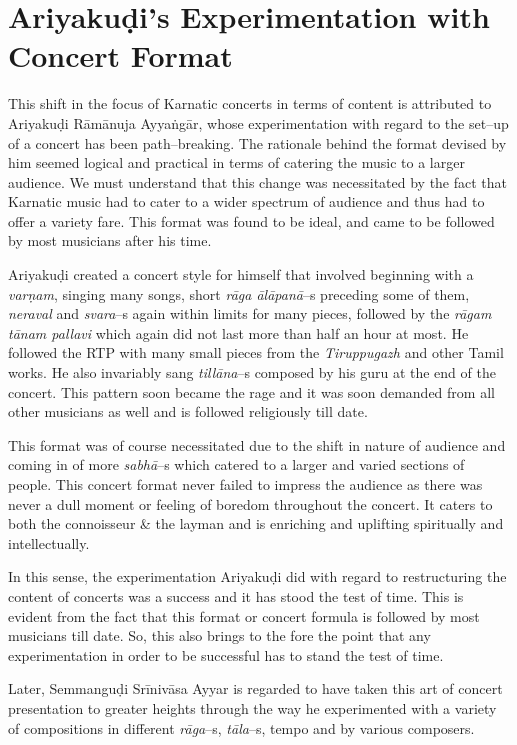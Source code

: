 \section*{Ariyakuḍi’s Experimentation with Concert Format}

This shift in the focus of Karnatic concerts in terms of content is attributed to Ariyakuḍi Rāmānuja Ayyaṅgār, whose experimentation with regard to the set–up of a concert has been path–breaking. The rationale behind the format devised by him seemed logical and practical in terms of catering the music to a larger audience. We must understand that this change was necessitated by the fact that Karnatic music had to cater to a wider spectrum of audience and thus had to offer a variety fare. This format was found to be ideal, and came to be followed by most musicians after his time.

Ariyakuḍi created a concert style for himself that involved beginning with a \textit{varṇam}, singing many songs, short \textit{rāga ālāpanā}–s preceding some of them, \textit{neraval} and \textit{svara}–s again within limits for many pieces, followed by the \textit{rāgam tānam pallavi} which again did not last more than half an hour at most. He followed the RTP with many small pieces from the \textit{Tiruppugazh} and other Tamil works. He also invariably sang \textit{tillāna}–s composed by his guru at the end of the concert. This pattern soon became the rage and it was soon demanded from all other musicians as well and is followed religiously till date.

This format was of course necessitated due to the shift in nature of audience and coming in of more \textit{sabhā}–s which catered to a larger and varied sections of people. This concert format never failed to impress the audience as there was never a dull moment or feeling of boredom throughout the concert. It caters to both the connoisseur \& the layman and is enriching and uplifting spiritually and intellectually. 

In this sense, the experimentation Ariyakuḍi did with regard to restructuring the content of concerts was a success and it has stood the test of time. This is evident from the fact that this format or concert formula is followed by most musicians till date. So, this also brings to the fore the point that any experimentation in order to be successful has to stand the test of time.

Later, Semmanguḍi Srīnivāsa Ayyar is regarded to have taken this art of concert presentation to greater heights through the way he experimented with a variety of compositions in different \textit{rāga}–s, \textit{tāla}–s, tempo and by various composers.

